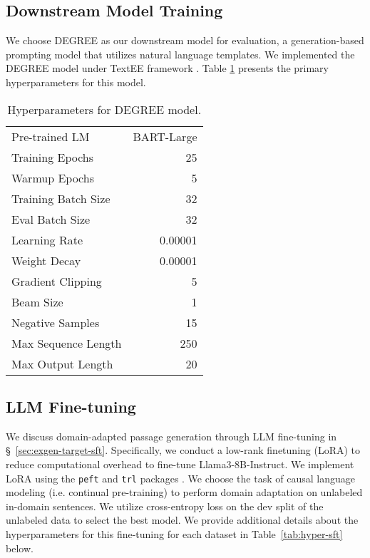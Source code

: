 \subsection{Downstream Model Training}

We choose DEGREE \cite{hsu-etal-2022-degree} as our downstream model for evaluation, a generation-based prompting model that utilizes natural language templates.
We implemented the DEGREE model under TextEE framework \cite{huang-etal-2024-textee}.
Table \ref{tab:hyper-degree} presents the primary hyperparameters for this model.

\begin{table}[h]
    \centering
    \small
    \begin{tabular}{lr}
        \toprule
        Pre-trained LM & BART-Large \\
        Training Epochs & 25 \\
        Warmup Epochs & 5 \\
        Training Batch Size & 32 \\
        Eval Batch Size & 32 \\
        Learning Rate & 0.00001 \\
        Weight Decay & 0.00001 \\
        Gradient Clipping & 5 \\
        Beam Size & 1 \\
        Negative Samples & 15 \\
        Max Sequence Length & 250 \\
        Max Output Length & 20 \\
        \bottomrule
    \end{tabular}
    \caption{Hyperparameters for DEGREE model.}
    \label{tab:hyper-degree}
\end{table}

\subsection{LLM Fine-tuning}

We discuss domain-adapted passage generation through LLM fine-tuning in \S~\ref{sec:exgen-target-sft}.
Specifically, we conduct a low-rank finetuning (LoRA) \cite{DBLP:journals/corr/abs-2106-09685} to reduce computational overhead to fine-tune Llama3-8B-Instruct. We implement LoRA using the \texttt{peft} and \texttt{trl} packages \cite{peft, vonwerra2022trl}. We choose the task of causal language modeling (i.e. continual pre-training) to perform domain adaptation on unlabeled in-domain sentences. 
We utilize cross-entropy loss on the dev split of the unlabeled data to select the best model.
We provide additional details about the hyperparameters for this fine-tuning for each dataset in Table~\ref{tab:hyper-sft} below.

